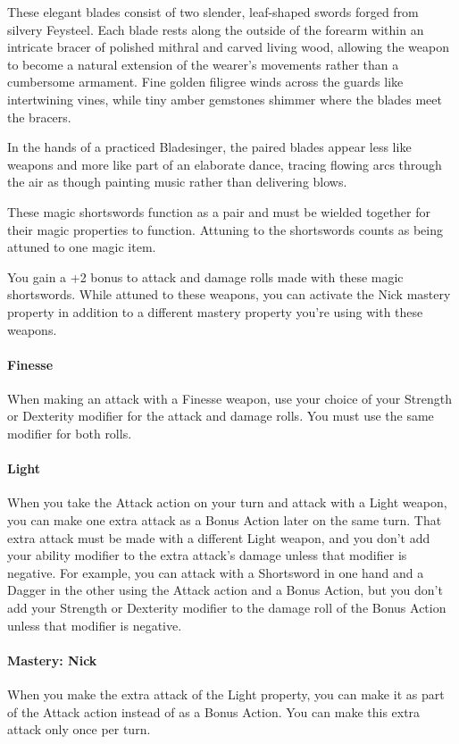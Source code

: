 \documentclass[letterpaper,openany,oneside,twocolumn]{book}
\begin{document}
{\entryfont These elegant blades consist of two slender, leaf-shaped swords forged from silvery Feysteel. Each blade rests along the outside of the forearm within an intricate bracer of polished mithral and carved living wood, allowing the weapon to become a natural extension of the wearer's movements rather than a cumbersome armament. Fine golden filigree winds across the guards like intertwining vines, while tiny amber gemstones shimmer where the blades meet the bracers.

In the hands of a practiced Bladesinger, the paired blades appear less like weapons and more like part of an elaborate dance, tracing flowing arcs through the air as though painting music rather than delivering blows.

These magic shortswords function as a pair and must be wielded together for their magic properties to function. Attuning to the shortswords counts as being attuned to one magic item.

You gain a +2 bonus to attack and damage rolls made with these magic shortswords. While attuned to these weapons, you can activate the Nick mastery property in addition to a different mastery property you're using with these weapons.

\paragraph*{Finesse} When making an attack with a Finesse weapon, use your choice of your Strength or Dexterity modifier for the attack and damage rolls. You must use the same modifier for both rolls.

\paragraph*{Light} When you take the Attack action on your turn and attack with a Light weapon, you can make one extra attack as a Bonus Action later on the same turn. That extra attack must be made with a different Light weapon, and you don't add your ability modifier to the extra attack's damage unless that modifier is negative. For example, you can attack with a Shortsword in one hand and a Dagger in the other using the Attack action and a Bonus Action, but you don't add your Strength or Dexterity modifier to the damage roll of the Bonus Action unless that modifier is negative.

\paragraph*{Mastery: Nick} When you make the extra attack of the Light property, you can make it as part of the Attack action instead of as a Bonus Action. You can make this extra attack only once per turn.}
\end{document}
